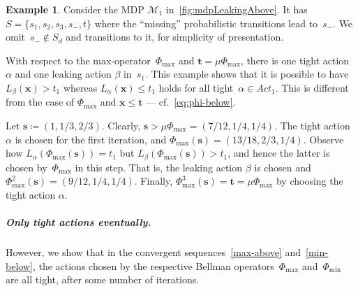 \documentclass[preprint,12pt]{elsarticle}
\theoremstyle{plain}
\theoremstyle{definition}
\newtheorem{example}[theorem]{Example}
\theoremstyle{remark}
\theoremstyle{claimstyle}
\newcommand{\mdp}{\mathcal{M}}
\begin{document}
\begin{example}
Consider the MDP $\mdp_1$ in~\cref{fig:mdpLeakingAbove}. 
It has~$S = \{s_1, s_2, s_3, s_{-}, t\}$ where the ``missing'' probabilistic transitions lead to~$s_{-}$.
We omit~$s_{-} \not\in S_d$ and transitions to it, for simplicity of presentation.

With respect to the max-operator~$\Phi_{\max}$ and $\bm{t} = \mu\Phi_{\max}$, there is one tight action $\alpha$ and one leaking action $\beta$ in~$s_1$. 
This example shows that it is possible to have $L_\beta(\bm{x}) > t_1$ whereas $L_{\alpha}(\bm{x}) \leq t_1$ holds for all tight~$\alpha \in Act_1$.
This is different from the case of $\Phi_{\max}$ and $\bm{x} \leq \bm{t}$ --- cf.\ \cref{eq:phi-below}.

Let $\bm{s} \coloneq (1, 1/3, 2/3)$. Clearly, $\bm{s} > \mu\Phi_{\max} = (7/12, 1/4, 1/4)$. 
The tight action $\alpha$ is chosen for the first iteration, and $\Phi_{\max}(\bm{s}) = \left(13/18, 2/3, 1/4\right)$. 
Observe how $L_\alpha(\Phi_{\max}(\bm{s})) = t_1$ but $L_\beta(\Phi_{\max}(\bm{s})) > t_1$, and hence the latter is chosen by~$\Phi_{\max}$ in this step. 
That is, the leaking action $\beta$ is chosen and $\Phi_{\max}^{2}(\bm{s}) = \left(9/12, 1/4, 1/4\right)$.
Finally, $\Phi_{\max}^{3}(\bm{s}) = \bm{t} = \mu\Phi_{\max}$ by choosing the tight action $\alpha$.
\end{example}

\subparagraph*{Only tight actions eventually.} 
However, we show that in the convergent sequences~\eqref{max-above} and~\eqref{min-below}, the actions chosen by the respective Bellman operators~$\Phi_{\max}$ and~$\Phi_{\min}$ are all tight, after some number of iterations.
\end{document}
